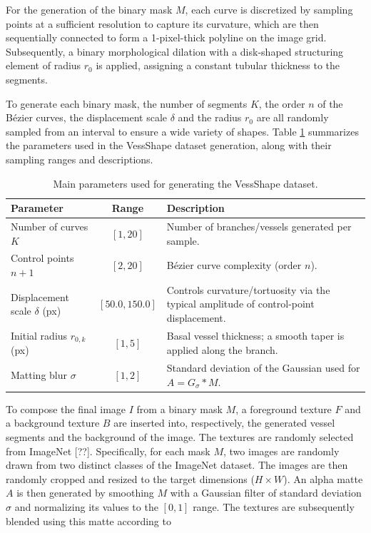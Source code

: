 \documentclass[%
reprint,
nofootinbib,
 amsmath,amssymb,
aps,
superscriptaddress,
showkeys,
longbibliography
]{revtex4-1}
\begin{document}
For the generation of the binary mask $M$, each curve is discretized by sampling points at a sufficient resolution to capture its curvature, which are then sequentially connected to form a 1-pixel-thick polyline on the image grid. Subsequently, a binary morphological dilation with a disk-shaped structuring element of radius $r_0$ is applied, assigning a constant tubular thickness to the segments. 

To generate each binary mask, the number of segments $K$, the order $n$ of the Bézier curves, the displacement scale $\delta$ and the radius $r_0$ are all randomly sampled from an interval to ensure a wide variety of shapes. Table \ref{tab:vessshape_params} summarizes the parameters used in the VessShape dataset generation, along with their sampling ranges and descriptions.

\begin{table}[t]
\caption{Main parameters used for generating the VessShape dataset.}
\label{tab:vessshape_params}
\centering
\begin{tabularx}{\textwidth}{l c X}
\hline
    \textbf{Parameter} & \textbf{Range} & \textbf{Description} \\
\hline
Number of curves $K$ & $[1,20]$ & Number of branches/vessels generated per sample. \\
Control points $n{+}1$ & $[2,20]$ & Bézier curve complexity (order $n$). \\
Displacement scale $\delta$ (px) & $[50.0,150.0]$ & Controls curvature/tortuosity via the typical amplitude of control-point displacement. \\
Initial radius $r_{0,k}$ (px) & $[1,5]$ & Basal vessel thickness; a smooth taper is applied along the branch. \\
Matting blur $\sigma$ & $[1,2]$ & Standard deviation of the Gaussian used for $A = G_{\sigma} * M$. \\

\hline
\end{tabularx}
\end{table}

To compose the final image $I$ from a binary mask $M$, a foreground texture $F$ and a background texture $B$ are inserted into, respectively, the generated vessel segments and the background of the image. The textures are randomly selected from ImageNet [??]. Specifically, for each mask $M$, two images are randomly drawn from two distinct classes of the ImageNet dataset. The images are then randomly cropped and resized to the target dimensions ($H \times W$). An alpha matte $A$ is then generated by smoothing $M$ with a Gaussian filter of standard deviation $\sigma$ and normalizing its values to the $[0, 1]$ range. The textures are subsequently blended using this matte according to 
\end{document}
